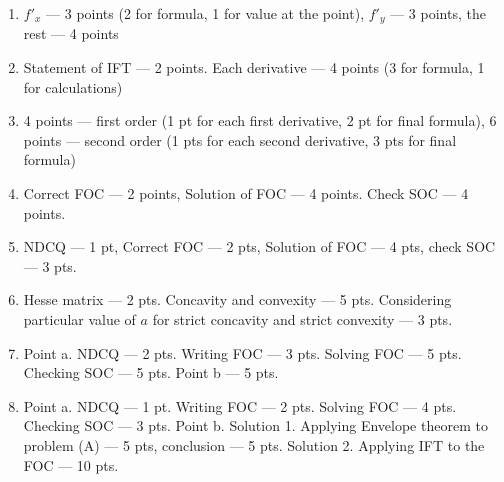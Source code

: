 \documentclass[pdftex, A4, 12pt]{article}
\begin{document}
\begin{enumerate}
\item $f'_x$ --- 3 points (2 for formula, 1 for value at  the point), $f'_y$ --- 3 points, the rest --- 4 points
\item Statement of IFT --- 2 points. Each derivative --- 4 points (3 for formula, 1 for calculations)
\item 4 points --- first order (1 pt for each first derivative, 2 pt for final formula), 6 points --- second order (1 pts for each second derivative, 3 pts for final formula)
\item Correct FOC --- 2 points, Solution of FOC --- 4 points. Check SOC --- 4 points.
\item NDCQ --- 1 pt, Correct FOC --- 2 pts, Solution of FOC --- 4 pts, check SOC --- 3 pts.
\item Hesse matrix --- 2 pts. Concavity and convexity --- 5 pts. Considering particular value of $a$ for strict concavity and strict convexity --- 3  pts.

\item Point a. NDCQ --- 2 pts. Writing FOC --- 3 pts. Solving FOC --- 5 pts. Checking SOC --- 5 pts. Point b --- 5 pts.

\item  Point a. NDCQ --- 1 pt. Writing FOC --- 2 pts. Solving FOC --- 4 pts. Checking SOC --- 3 pts. Point b. Solution 1. Applying Envelope theorem to problem (A) --- 5 pts, conclusion --- 5 pts. Solution 2. Applying IFT to the FOC --- 10 pts.

\end{enumerate}
\end{document}
